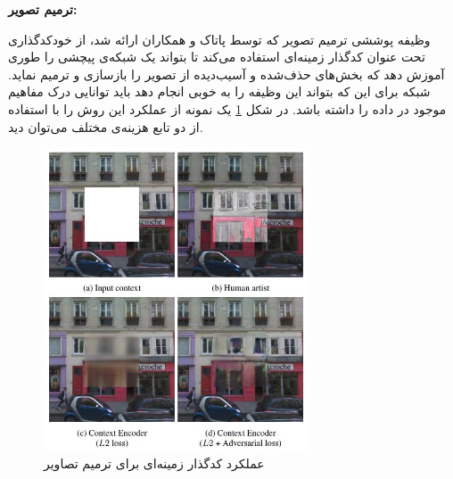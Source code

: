 \noindent\textbf{ترمیم تصویر:}

وظیفه پوششی ترمیم تصویر
که توسط پاتاک و همکاران\cite{pathak2016context}
ارائه شد، از خودکدگذاری تحت عنوان
کدگذار زمینه‌ای
استفاده می‌کند تا بتواند یک شبکه‌ی پیچشی را طوری آموزش دهد که بخش‌های حذف‌شده و آسیب‌دیده از تصویر را بازسازی و ترمیم نماید. شبکه برای این که بتواند این وظیفه را به خوبی انجام دهد باید توانایی درک مفاهیم موجود در داده را داشته باشد.
در شکل \ref{fig:inpainting-losses}
یک نمونه از عملکرد این روش را با استفاده از دو تابع هزینه‌ی مختلف می‌توان دید.

\begin{figure}[htb!]
\centering
\includegraphics[width=0.7\textwidth]{Images/Chapter2/inpainting-losses.png}
\caption{عملکرد کدگذار زمینه‌ای برای ترمیم تصاویر}
\label{fig:inpainting-losses}
\end{figure}

